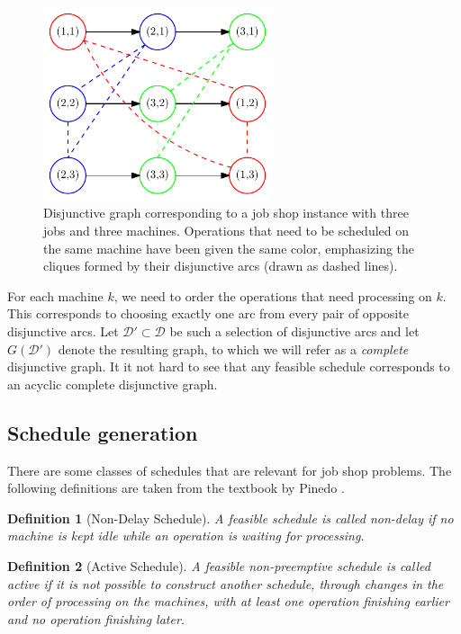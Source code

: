 \documentclass{article}
\theoremstyle{definition}
\theoremstyle{plain}
\newtheorem{define}{Definition}[section]
\begin{document}
\begin{figure}[t]
  \centering
  \includegraphics[width=0.6\textwidth]{figures/disjunctive-graph.pdf}
  \caption{Disjunctive graph corresponding to a job shop instance with three
    jobs and three machines. Operations that need to be scheduled on the same
    machine have been given the same color, emphasizing the cliques formed by
    their disjunctive arcs (drawn as dashed lines).}
  \label{fig:disjunctive-graph-example}
\end{figure}

For each machine $k$, we need to order the operations that need processing on
$k$. This corresponds to choosing exactly one arc from every pair of opposite
disjunctive arcs. Let $\mathcal{D}' \subset \mathcal{D}$ be such a selection of
disjunctive arcs and let $G(\mathcal{D}')$ denote the resulting graph, to which
we will refer as a \textit{complete} disjunctive graph. It it not hard to see
that any feasible schedule corresponds to an acyclic complete disjunctive
graph.


\subsection{Schedule generation}
There are some classes of schedules that are relevant for job shop problems. The
following definitions are taken from the textbook by Pinedo
\cite{pinedoSchedulingTheoryAlgorithms2016}.

\begin{define}[Non-Delay Schedule]
A feasible schedule is called non-delay if no
machine is kept idle while an operation is waiting for processing.
\end{define}

\begin{define}[Active Schedule]
A feasible non-preemptive schedule is called active if
it is not possible to construct another schedule, through changes in the order
of processing on the machines, with at least one operation finishing earlier and
no operation finishing later.
\end{define}
\end{document}
